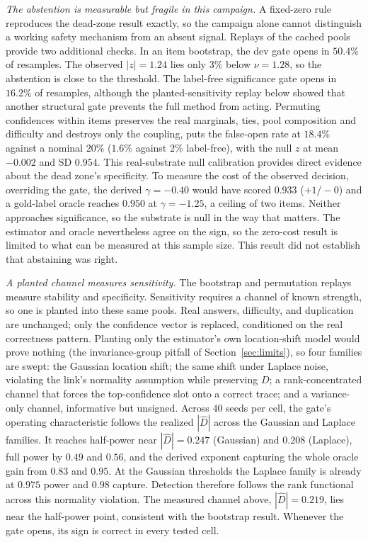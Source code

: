 \documentclass{article}
\newcommand{\Dhat}{\widehat{D}}
\begin{document}
\emph{The abstention is measurable but fragile in this campaign.} A fixed-zero
rule reproduces the dead-zone result exactly, so the campaign alone
cannot distinguish a working safety mechanism from an absent signal. Replays
of the cached pools provide two additional checks. In an item bootstrap, the
dev gate opens in $50.4\%$ of resamples. The observed $|z|=1.24$ lies only
$3\%$ below $\nu=1.28$, so the abstention is close to the threshold. The
label-free significance gate opens in $16.2\%$ of resamples, although the
planted-sensitivity replay below showed that another structural gate prevents
the full method from acting. Permuting confidences within items preserves the
real marginals, ties, pool composition and difficulty and destroys only the
coupling, puts the false-open rate at $18.4\%$ against a nominal $20\%$
($1.6\%$ against $2\%$ label-free), with the null $z$ at mean $-0.002$ and SD
$0.954$. This real-substrate null calibration provides direct evidence about
the dead zone's specificity. To measure the cost of the observed decision,
overriding the gate, the derived $\gamma=-0.40$ would have scored $0.933$
($+1/-0$) and a gold-label oracle reaches $0.950$ at $\gamma=-1.25$, a ceiling
of two items. Neither approaches significance, so the substrate is null in the
way that matters. The estimator and oracle nevertheless agree on the sign, so
the zero-cost result is limited to what can be measured at this sample size.
This result did not establish that abstaining was right.

\emph{A planted channel measures sensitivity.} The bootstrap and permutation
replays measure stability and specificity. Sensitivity requires a channel of
known strength, so one is planted into these same pools. Real answers,
difficulty, and duplication are unchanged;
only the confidence vector is replaced, conditioned on the real correctness
pattern. Planting only the estimator's own location-shift model would prove
nothing (the invariance-group pitfall of Section~\ref{sec:limits}), so four
families are swept: the Gaussian location shift; the same shift under Laplace
noise, violating the link's normality assumption while preserving $D$; a
rank-concentrated channel that forces the top-confidence slot onto a correct
trace; and a variance-only channel, informative but unsigned. Across $40$
seeds per cell, the gate's operating characteristic follows the realized
$|\Dhat|$ across the Gaussian and Laplace families. It reaches half-power near
$|\Dhat|=0.247$ (Gaussian) and $0.208$ (Laplace), full power by $0.49$ and
$0.56$, and the derived exponent capturing the whole oracle gain from $0.83$
and $0.95$. At the Gaussian thresholds the Laplace family is already at
$0.975$ power and $0.98$ capture. Detection therefore follows the rank
functional across this normality violation. The measured channel above,
$|\Dhat|=0.219$, lies near the half-power point, consistent with the bootstrap
result. Whenever the gate opens, its sign is correct in every tested cell.
\end{document}
